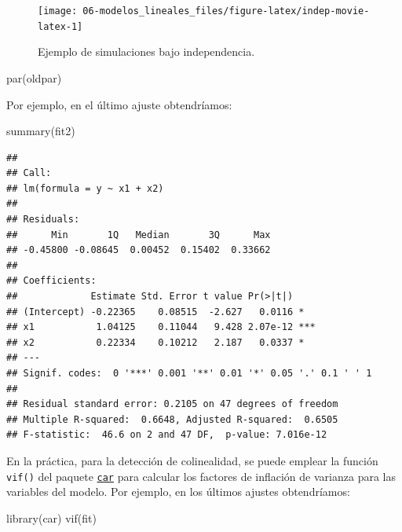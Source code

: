 \documentclass[
]{book}
\newenvironment{Shaded}{\begin{snugshade}}{\end{snugshade}}
\newcommand{\FunctionTok}[1]{\textcolor[rgb]{0.00,0.00,0.00}{#1}}
\newcommand{\NormalTok}[1]{#1}
\theoremstyle{break}
\theoremstyle{definition}
\theoremstyle{definition}
\theoremstyle{definition}
\theoremstyle{definition}
\theoremstyle{remark}
\begin{document}
\begin{figure}[!htb]

{\centering \texttt{[image: 06-modelos\_lineales\_files/figure-latex/indep-movie-latex-1]} 

}

\caption{Ejemplo de simulaciones bajo independencia.}\label{fig:indep-movie-latex}
\end{figure}

\begin{Shaded}
\begin{Highlighting}[]
\FunctionTok{par}\NormalTok{(oldpar)}
\end{Highlighting}
\end{Shaded}

Por ejemplo, en el último ajuste obtendríamos:

\begin{Shaded}
\begin{Highlighting}[]
\FunctionTok{summary}\NormalTok{(fit2)}
\end{Highlighting}
\end{Shaded}

\begin{verbatim}
## 
## Call:
## lm(formula = y ~ x1 + x2)
## 
## Residuals:
##      Min       1Q   Median       3Q      Max 
## -0.45800 -0.08645  0.00452  0.15402  0.33662 
## 
## Coefficients:
##             Estimate Std. Error t value Pr(>|t|)    
## (Intercept) -0.22365    0.08515  -2.627   0.0116 *  
## x1           1.04125    0.11044   9.428 2.07e-12 ***
## x2           0.22334    0.10212   2.187   0.0337 *  
## ---
## Signif. codes:  0 '***' 0.001 '**' 0.01 '*' 0.05 '.' 0.1 ' ' 1
## 
## Residual standard error: 0.2105 on 47 degrees of freedom
## Multiple R-squared:  0.6648, Adjusted R-squared:  0.6505 
## F-statistic:  46.6 on 2 and 47 DF,  p-value: 7.016e-12
\end{verbatim}

En la práctica, para la detección de colinealidad, se puede emplear la función
\texttt{vif()} del paquete \href{https://CRAN.R-project.org/package=car}{\texttt{car}} para calcular los factores de inflación de varianza para las variables del modelo.
Por ejemplo, en los últimos ajustes obtendríamos:

\begin{Shaded}
\begin{Highlighting}[]
\FunctionTok{library}\NormalTok{(car)}
\FunctionTok{vif}\NormalTok{(fit)}
\end{Highlighting}
\end{Shaded}
\end{document}
